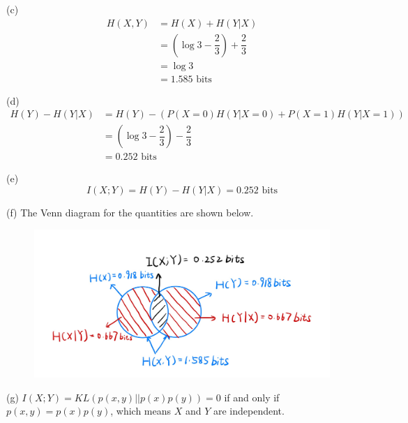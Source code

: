 (c)
\begin{align*}
H(X,Y) &= H(X) + H(Y|X) \\
&= \left(\log 3 - \dfrac{2}{3}\right) + \dfrac{2}{3} \\
&= \log 3 \\
&= 1.585 \text{\ bits}
\end{align*}

(d)
\begin{align*}
H(Y)-H(Y|X) &= H(Y) - \left(P(X=0)H(Y|X=0) + P(X=1)H(Y|X=1)\right) \\
&= \left(\log 3 - \dfrac{2}{3}\right) - \dfrac{2}{3} \\
&= 0.252 \text{\ bits}
\end{align*}

(e)
$$ I(X;Y) = H(Y) - H(Y|X) = 0.252 \text{\ bits}$$

(f) The Venn diagram for the quantities are shown below.

\begin{figure}[htbp]
    \centering
	\includegraphics[width=\textwidth]{venn.jpg}
\end{figure}

(g) $I(X;Y)=KL\left(p(x,y)||p(x)p(y)\right)=0$ if and only if $p(x,y)=p(x)p(y)$, which means $X$ and $Y$ are independent.

\newpage